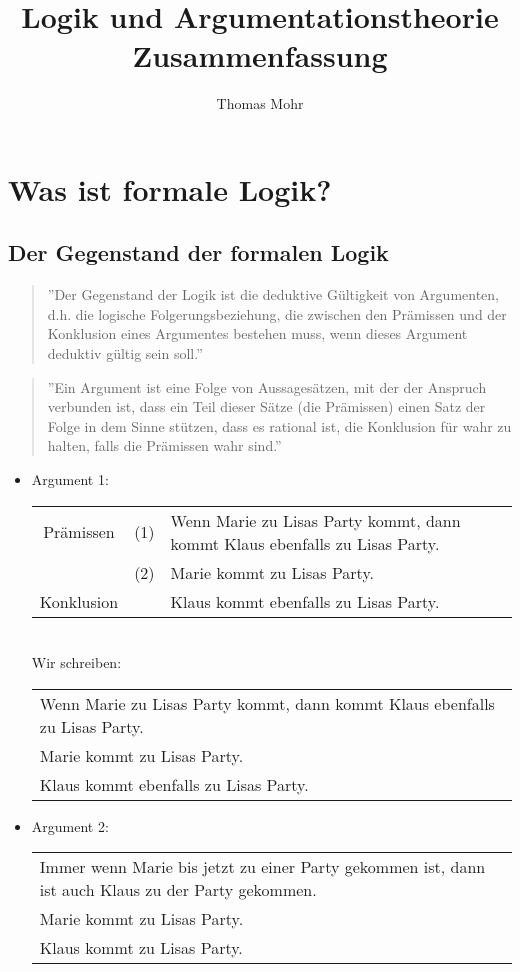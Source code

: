 \documentclass{scrartcl}
\title{Logik und Argumentationstheorie \\ Zusammenfassung}
\author{Thomas Mohr}
\date{}
\begin{document}
\maketitle

\section{Was ist formale Logik?}

\subsection{Der Gegenstand der formalen Logik}

\begin{quote}
	''Der Gegenstand der Logik ist die deduktive Gültigkeit von Argumenten, d.h. die logische Folgerungsbeziehung, die zwischen den Prämissen und der Konklusion eines Argumentes bestehen muss, wenn dieses Argument deduktiv gültig sein soll.''
\end{quote}

\begin{quote}
	''Ein Argument ist eine Folge von Aussagesätzen, mit der der Anspruch verbunden ist, dass ein Teil dieser Sätze (die Prämissen) einen Satz der Folge in dem Sinne stützen, dass es rational ist, die Konklusion für wahr zu halten, falls die Prämissen wahr sind.''
\end{quote}

\begin{itemize}
	\item Argument 1: \\
	\begin{tabularx}{\linewidth}{c c X}
		Prämissen & (1) & Wenn Marie zu Lisas Party kommt, dann kommt Klaus ebenfalls zu Lisas Party. \\ 
		& (2) & Marie kommt zu Lisas Party. \\ 
		\hline 
		Konklusion &  & Klaus kommt ebenfalls zu Lisas Party.
	\end{tabularx} \\
	
	Wir schreiben: \\
	
	\begin{tabular}{l}
		Wenn Marie zu Lisas Party kommt, dann kommt Klaus ebenfalls zu Lisas Party. \\ 
		Marie kommt zu Lisas Party. \\ 
		\hline 
		Klaus kommt ebenfalls zu Lisas Party. \\ 
	\end{tabular} 
	\item Argument 2: \\
	\begin{tabularx}{\linewidth}{X}
		Immer wenn Marie bis jetzt zu einer Party gekommen ist, dann ist auch Klaus zu der Party gekommen. \\
		Marie kommt zu Lisas Party. \\
		\hline
		Klaus kommt zu Lisas Party.
	\end{tabularx} 
\end{itemize}
\end{document}

